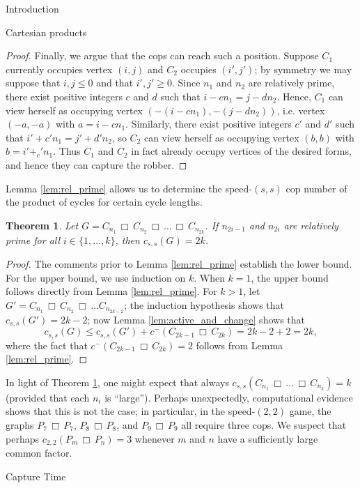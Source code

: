 \documentclass[12pt]{amsart}
\newtheorem{theorem}[lemma]{Theorem}
\theoremstyle{definition}
\def\cart{\, \Box \,}
\newcommand{\speeds}{c_{s,s}}
\begin{document}
\begin{section}{Introduction}
\begin{section}{Cartesian products}
\begin{proof}
Finally, we argue that the cops can reach such a position.  Suppose $C_1$ currently occupies vertex $(i,j)$ and $C_2$ occupies $(i',j')$; by symmetry we may suppose that $i, j \le 0$ and that $i',j' \ge 0$.  Since $n_1$ and $n_2$ are relatively prime, there exist positive integers $c$ and $d$ such that $i-cn_1 = j-dn_2$.  Hence, $C_1$ can view herself as occupying vertex $(-(i-cn_1), -(j-dn_2))$, i.e. vertex $(-a,-a)$ with $a = i-cn_1$.  Similarly, there exist positive integers $c'$ and $d'$ such that $i'+c'n_1 = j'+d'n_2$, so $C_2$ can view herself as occupying vertex $(b,b)$ with $b = i'+_c'n_1$.  Thus $C_1$ and $C_2$ in fact already occupy vertices of the desired forms, and hence they can capture the robber.
\end{proof}

Lemma \ref{lem:rel_prime} allows us to determine the speed-$(s,s)$ cop number of the product of cycles for certain cycle lengths.
\begin{theorem}\label{thm:two_cycles}
Let $G = C_{n_1} \cart C_{n_2} \cart \dots \cart C_{n_{2k}}$.  If $n_{2i-1}$ and $n_{2i}$ are relatively prime for all $i \in \{1, \dots, k\}$, then $\speeds(G) = 2k$.  
\end{theorem}
\begin{proof}
The comments prior to Lemma \ref{lem:rel_prime} establish the lower bound.  For the upper bound, we use induction on $k$.  When $k=1$, the upper bound follows directly from Lemma \ref{lem:rel_prime}.  For $k > 1$, let $G' = C_{n_1} \cart C_{n_2} \cart \dots C_{n_{2k-2}}$; the induction hypothesis shows that $\speeds(G') = 2k-2$; now Lemma \ref{lem:active_and_change} shows that
\[\speeds(G) \le \speeds(G') + c^-(C_{2k-1} \cart C_{2k}) = 2k-2 + 2 = 2k,\]
where the fact that $c^-(C_{2k-1} \cart C_{2k}) = 2$ follows from Lemma \ref{lem:rel_prime}.
\end{proof}

In light of Theorem \ref{thm:two_cycles}, one might expect that always $\speeds(C_{n_1} \cart \dots \cart C_{n_k}) = k$ (provided that each $n_i$ is ``large'').  Perhaps unexpectedly, computational evidence shows that this is not the case; in particular, in the speed-$(2,2)$ game, the graphs $P_7 \cart P_7$, $P_8 \cart P_8$, and $P_9 \cart P_9$ all require three cops.  We suspect that perhaps $c_{2,2}(P_m \cart P_n) = 3$ whenever $m$ and $n$ have a sufficiently large common factor.
\end{section}




\begin{section}{Capture Time}\label{sec:capture_time}


\end{section}
\end{section}
\end{document}
